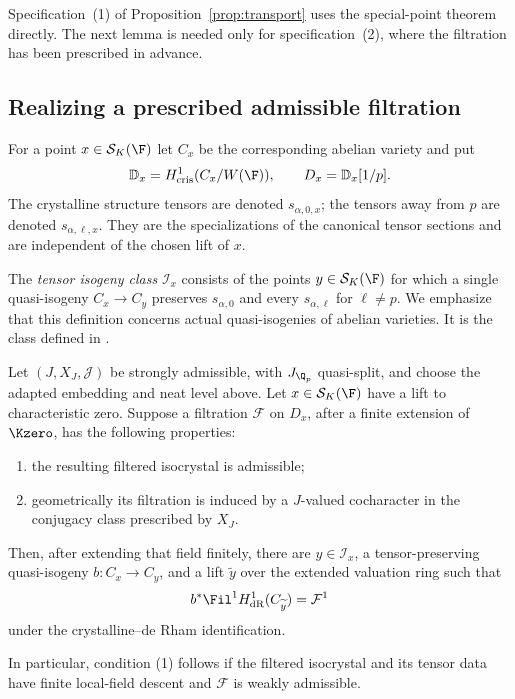 Specification~\textup{(1)} of Proposition~\ref{prop:transport}
uses the special-point theorem
\cite[Theorem~2.2.7]{KisinZhou2025} directly.  The next lemma is
needed only for specification~\textup{(2)}, where the filtration
has been prescribed in advance.

\subsection{Realizing a prescribed admissible filtration}

For a point $x\in\mathcal S_K(\F)$ let $C_x$ be the corresponding
abelian variety and put
\[
 \mathbb D_x=H^1_{\mathrm{cris}}(C_x/W(\F)),\qquad
 D_x=\mathbb D_x[1/p].
\]
The crystalline structure tensors are denoted $s_{\alpha,0,x}$;
the tensors away from $p$ are denoted $s_{\alpha,\ell,x}$.
They are the specializations of the canonical tensor sections and
are independent of the chosen lift of $x$.

The \emph{tensor isogeny class} $\mathcal I_x$ consists of the points
$y\in\mathcal S_K(\F)$ for which a single quasi-isogeny
$C_x\to C_y$ preserves $s_{\alpha,0}$ and every
$s_{\alpha,\ell}$ for $\ell\ne p$.  We emphasize that this
definition concerns actual quasi-isogenies of abelian varieties.
It is the class defined in \cite[\S2.2.4]{KisinZhou2025}.

\begin{lemma}
\label{lem:admissible-realization}
Let $(J,X_J,\mathcal J)$ be strongly admissible, with $J_{\Q_p}$
quasi-split, and choose the adapted embedding and neat level above.
Let $x\in\mathcal S_K(\F)$ have a lift to characteristic zero.
Suppose a filtration $\mathcal F$ on $D_x$, after a finite extension
of $\Kzero$, has the following properties:
\begin{enumerate}
\item the resulting filtered isocrystal is admissible;
\item geometrically its filtration is induced by a $J$-valued
cocharacter in the conjugacy class prescribed by $X_J$.
\end{enumerate}
Then, after extending that field finitely, there are $y\in\mathcal I_x$,
a tensor-preserving quasi-isogeny $b:C_x\to C_y$, and a lift
$\widetilde y$ over the extended valuation ring such that
\[
 b^*\Fil^1 H^1_{\mathrm{dR}}(C_{\widetilde y})=\mathcal F^1
\]
under the crystalline--de Rham identification.

In particular, condition \textup{(1)} follows if the filtered
isocrystal and its tensor data have finite local-field descent and
$\mathcal F$ is weakly admissible.
\end{lemma}

